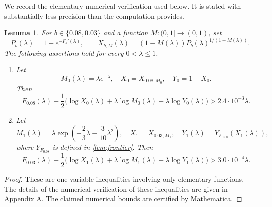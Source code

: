 \documentclass[reqno,final,12pt]{amsart}
\newtheorem{lem}[thm]{Lemma}
\begin{document}
We record the elementary numerical verification used below.  It is
stated with substantially less precision than the computation provides.

\begin{lem}\label{lem:numerics}
	For $b\in\{0.08,0.03\}$ and a function $M\colon(0,1]\to(0,1)$, set
	\begin{equation}\label{eq:X-def}
		P_b(\lambda)=1-e^{-F_b'(\lambda)},\qquad
		X_{b,M}(\lambda)=(1-M(\lambda))
		P_b(\lambda)^{1/(1-M(\lambda))}.
	\end{equation}
	The following assertions hold for every $0<\lambda\leq1$.
	
	\begin{enumerate}
		\item Let
		\[
		M_0(\lambda)=\lambda e^{-\lambda},\quad
		X_0=X_{0.08,M_0},\quad Y_0=1-X_0.
		\]
		Then
		\begin{equation}\label{eq:base-slack}
			F_{0.08}(\lambda)+\frac12\bigl(
			\log X_0(\lambda)+\lambda\log M_0(\lambda)
			+\lambda\log Y_0(\lambda)\bigr)
			>2.4\cdot10^{-3}\lambda.
		\end{equation}
		
		\item Let
		\[
		M_1(\lambda)=\lambda
		\exp\!\left(-\frac23\lambda-\frac3{10}\lambda^2\right),
		\quad X_1=X_{0.03,M_1},\quad
		Y_1(\lambda)=Y_{F_{0.08}}(X_1(\lambda)),
		\]
		where $Y_{F_{0.08}}$ is defined in \cref{lem:frontier}.
		Then
		\begin{equation}\label{eq:final-slack}
			F_{0.03}(\lambda)+\frac12\bigl(
			\log X_1(\lambda)+\lambda\log M_1(\lambda)
			+\lambda\log Y_1(\lambda)\bigr)
			>3.0\cdot10^{-4}\lambda.
		\end{equation}
	\end{enumerate}
\end{lem}

\begin{proof}
	These are one-variable inequalities involving only elementary
	functions. The details of the numerical verification of these inequalities are given in Appendix A. The claimed numerical bounds are certified by Mathematica.
\end{proof} 
 
\Main*
\end{document}
